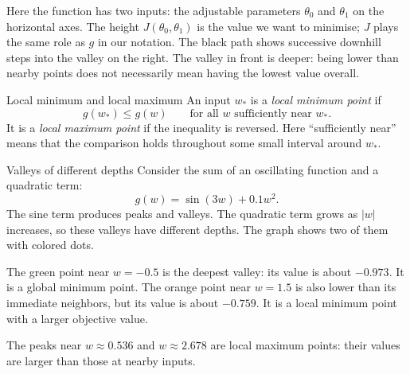 \documentclass[a4paper,12pt,oneside]{report}
\begin{document}
Here the function has two inputs: the adjustable parameters $\theta_0$
and $\theta_1$ on the horizontal axes. The height $J(\theta_0,\theta_1)$
is the value we want to minimise; $J$ plays the same role as $g$ in
our notation. The black path shows successive downhill steps into
the valley on the right. The valley in front is deeper: being lower
than nearby points does not necessarily mean having the lowest value
overall.

\begin{frameddefn}{Local minimum and local maximum}\label{def:local-optimum}
An input $w_*$ is a \emph{local minimum point} if
\[
  g(w_*)\leq g(w)\qquad\text{for all }w\text{ sufficiently near }w_*.
\]
It is a \emph{local maximum point} if the inequality is reversed.
Here ``sufficiently near'' means that the comparison holds throughout
some small interval around $w_*$.
\end{frameddefn}

\begin{framedexample}{Valleys of different depths}
Consider the sum of an oscillating function and a quadratic term:
\[
  g(w)=\sin(3w)+0.1w^2.
\]
The sine term produces peaks and valleys. The quadratic term grows
as $|w|$ increases, so these valleys have different depths. The graph
shows two of them with colored dots.

\begin{center}
\end{center}

The green point near $w=-0.5$ is the deepest valley: its value is
about $-0.973$. It is a global minimum point. The orange point near
$w=1.5$ is also lower than its immediate neighbors, but its value is
about $-0.759$. It is a local minimum point with a larger objective
value.

The peaks near $w\approx0.536$ and $w\approx2.678$ are local maximum
points: their values are larger than those at nearby inputs.
\end{framedexample}
\end{document}
